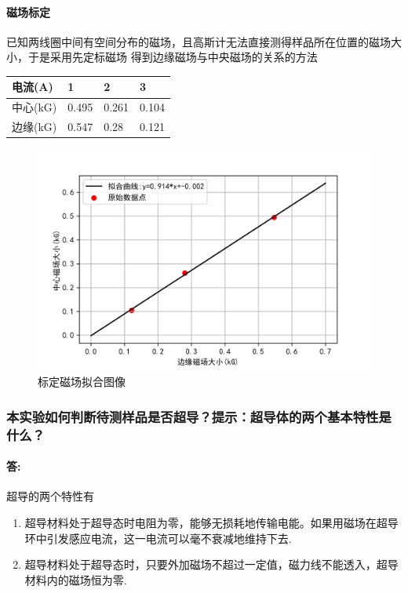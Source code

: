 \documentclass{ctexart}
\theoremstyle{ansstyle}
\begin{document}
\paragraph[short]{磁场标定}  已知两线圈中间有空间分布的磁场，且高斯计无法直接测得样品所在位置的磁场大小，于是采用先定标磁场
得到边缘磁场与中央磁场的关系的方法
\begin{table}[H]
\centering
\begin{tabular}{@{}llll@{}}
\toprule
电流(A)  & 1     & 2     & 3     \\ \midrule
中心(kG) & 0.495 & 0.261 & 0.104 \\
边缘(kG) & 0.547 & 0.28  & 0.121  \\ \bottomrule
\end{tabular}
\end{table}
\begin{figure}[H]
	\centering
	\caption{标定磁场拟合图像}
	
	\includegraphics[width=0.75\linewidth]{./png/q1.png}
\end{figure}
\subsubsection{本实验如何判断待测样品是否超导？提示：超导体的两个基本特性是
	什么？}
	\paragraph{答:} 超导的两个特性有
	\begin{enumerate}
		\item 超导材料处于超导态时电阻为零，能够无损耗地传输电能。如果用磁场在超导环中引发感应电流，这一电流可以毫不衰减地维持下去.
		\item 超导材料处于超导态时，只要外加磁场不超过一定值，磁力线不能透入，超导材料内的磁场恒为零.
	\end{enumerate}	
	
\end{document}
